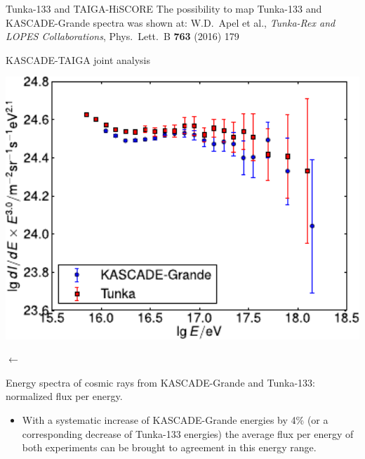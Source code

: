 \begin{frame}{Tunka-133 and TAIGA-HiSCORE}
\vspace{1ex}
The possibility to map Tunka-133 and KASCADE-Grande spectra was shown at: W.D.~Apel et al., \textit{Tunka-Rex and LOPES Collaborations}, Phys.\ Lett.\ B \textbf{763} (2016) 179
\end{frame}

\begin{frame}{KASCADE-TAIGA joint analysis}
\small
\begin{center}
    \begin{minipage}{0.55\textwidth}
     	\includegraphics[width=1\textwidth]{pics/KG_tunka133_scales.pdf}
    \end{minipage}
     $\longleftarrow$ 
\begin{minipage}{0.38\textwidth}	
  Energy spectra of cosmic rays from KASCADE-Grande and Tunka-133: normalized flux per energy.
\end{minipage}
\end{center}

\begin{itemize}
 \item  With a systematic increase of
KASCADE-Grande energies by 4\% (or a corresponding decrease of Tunka-133 energies) 
the average flux per energy of both experiments can be brought to agreement
in this energy range.
\end{itemize}
\end{frame}

